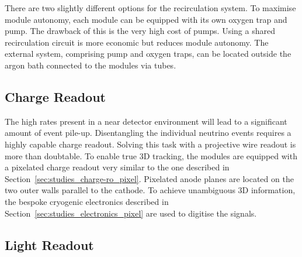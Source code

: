 There are two slightly different options for the recirculation system.
To maximise module autonomy, each module can be equipped with its own oxygen trap and \lar{} pump.
The drawback of this is the very high cost of \lar{} pumps.
Using a shared recirculation circuit is more economic but reduces module autonomy.
The external system, comprising pump and oxygen traps, can be located outside the argon bath connected to the modules via tubes.


\subsection{Charge Readout}
\label{sec:ac_argoncube_charge-ro}

The high rates present in a near detector environment will lead to a significant amount of event pile-up.
Disentangling the individual neutrino events requires a highly capable charge readout.
Solving this task with a projective wire readout is more than doubtable.
To enable true 3D tracking, the modules are equipped with a pixelated charge readout very similar to the one described in Section~\ref{sec:studies_charge-ro_pixel}.
Pixelated anode planes are located on the two outer walls parallel to the cathode.
To achieve unambiguous 3D information, the bespoke \pixlar{} cryogenic electronics described in Section~\ref{sec:studies_electronics_pixel} are used to digitise the signals.


\subsection{Light Readout}
\label{sec:ac_argoncube_light-ro}

